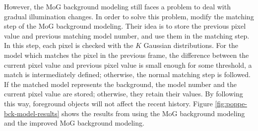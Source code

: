 However, the MoG background modeling still faces a problem to deal
with gradual illumination changes. In order to solve this
problem,  modify the matching step of
the MoG background modeling. Their idea is to store the previous pixel
value and previous matching model number, and use them in the matching
step. In this step, each pixel is checked with the $K$ Gaussian
distributions. For the model which matches the pixel in the previous
frame, the difference between the current pixel value and previous
pixel value is small enough for some threshold, a match is
intermediately defined; otherwise, the normal matching step is
followed. If the matched model represents the background, the model
number and the current pixel value are stored; otherwise, they retain
their values. By following this way, foreground objects will not
affect the recent history. Figure \ref{fig:poppe-bck-model-results}
shows the results from using the MoG background modeling and the
improved MoG background modeling.

